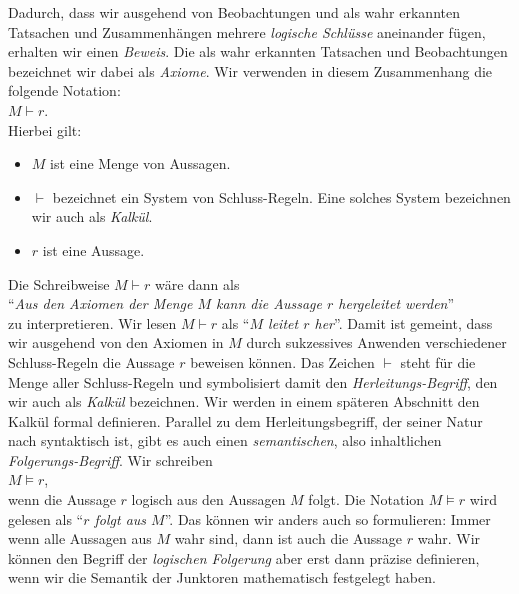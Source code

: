 Dadurch, dass wir ausgehend von Beobachtungen und als wahr erkannten Tatsachen und Zusammenh\"{a}ngen
mehrere \emph{logische Schl\"{u}sse} aneinander f\"{u}gen, erhalten wir einen \emph{Beweis}. 
Die als wahr erkannten Tatsachen und Beobachtungen bezeichnet wir dabei als \emph{Axiome}.
Wir verwenden in diesem Zusammenhang die folgende  Notation: \\[0.2cm]
\hspace*{1.3cm} $M \vdash r$. \\[0.2cm]
Hierbei gilt:
\begin{itemize}
\item $M$ ist eine Menge von Aussagen.
\item $\vdash$ bezeichnet ein System von Schluss-Regeln.  Eine solches System bezeichnen wir auch als \emph{Kalk\"{u}l}.
\item $r$ ist eine Aussage.  
\end{itemize}
Die Schreibweise $M \vdash r$ w\"{a}re dann als \\[0.2cm]
\hspace*{1.3cm} ``\emph{Aus den Axiomen der Menge $M$ kann die Aussage $r$ hergeleitet werden}'' \\[0.2cm]
zu interpretieren.  Wir lesen  $M \vdash r$ als ``\emph{$M$ leitet $r$ her}''.
Damit ist gemeint, dass wir ausgehend von den Axiomen in $M$ durch sukzessives
Anwenden verschiedener Schluss-Regeln die Aussage $r$ beweisen k\"{o}nnen.
Das Zeichen $\vdash$ steht f\"{u}r die Menge aller Schluss-Regeln und symbolisiert damit den
\emph{Herleitungs-Begriff}, den wir auch als \emph{Kalk\"{u}l} bezeichnen.  Wir werden  in einem
sp\"{a}teren Abschnitt den Kalk\"{u}l formal definieren.
Parallel zu dem Herleitungsbegriff, der seiner Natur nach syntaktisch ist, gibt es auch
einen \emph{semantischen}, also inhaltlichen \emph{Folgerungs-Begriff}.  Wir schreiben \\[0.2cm]
\hspace*{1.3cm} $M \models r$, \\[0.2cm]
wenn die Aussage $r$ logisch aus den Aussagen $M$ folgt.  
Die Notation $M \models r$ wird gelesen als ``\emph{$r$ folgt aus $M$}''.
Das k\"{o}nnen wir anders auch so
formulieren:  Immer wenn alle Aussagen aus $M$ wahr sind, dann ist auch die Aussage $r$ wahr.
Wir k\"{o}nnen den Begriff der \emph{logischen Folgerung} aber
erst dann pr\"{a}zise definieren, wenn wir die Semantik der Junktoren mathematisch festgelegt haben.

